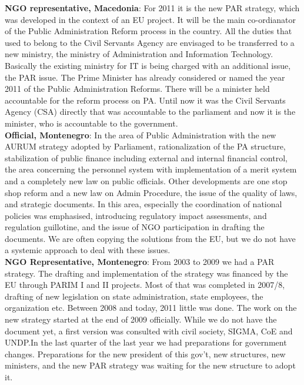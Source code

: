 \textbf{NGO representative, Macedonia}: For 2011 it is the new PAR strategy, which was developed in the context of an EU project. It will be the main co-ordianator of the Public Administration Reform process in the country. All the duties that used to belong to the Civil Servants Agency are envisaged to be transferred to a new ministry, the ministry of Administration and Information Technology. Basically the existing ministry for IT is being charged with an additional issue, the PAR issue. The Prime Minister has already considered or named the year 2011 of the Public Administration Reforms. There will be a minister held accountable for the reform process on PA. Until now it was the Civil Servants Agency (CSA) directly that was accountable to the parliament and now it is the minister, who is accountable to the government.\\
\textbf{Official, Montenegro}: In the area of Public Administration with the new AURUM strategy adopted by Parliament, rationalization of the PA structure, stabilization of public finance including external and internal financial control, the area concerning the personnel system with implementation of a merit system and a completely new law on public officials. Other developments are one stop shop reform and a new law on Admin Procedure, the issue of the quality of laws, and strategic documents. In this area, especially the coordination of national policies was emphasised, introducing regulatory impact assessments, and regulation guillotine, and the issue of NGO participation in drafting the documents. We are often copying the solutions from the EU, but we do not have a systemic approach to deal with these issues.\\
\textbf{NGO Representative, Montenegro}: From 2003 to 2009 we had a PAR strategy. The drafting and implementation of the strategy was financed by the EU through PARIM I and II projects. Most of that was completed in 2007/8, drafting of new legislation on state administration, state employees, the organization etc. Between 2008 and today, 2011 little was done. The work on the new strategy started at the end of 2009 officially. While we do not have the document yet, a first version was consulted with civil society, SIGMA, CoE and UNDP.In the last quarter of the last year we had preparations for government changes. Preparations for the new president of this gov't, new structures, new ministers, and the new PAR strategy was waiting for the new structure to adopt it.\newpage
